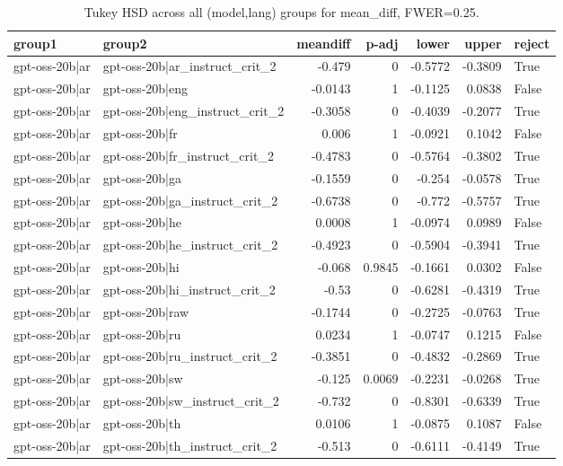 \begin{table}
\caption{Tukey HSD across all (model,lang) groups for mean_diff, FWER=0.25.}
\label{tab:tukey_all_models_all_langs_mean_diff}
\begin{tabular}{l l r r r r l}
\toprule
group1 & group2 & meandiff & p-adj & lower & upper & reject \\
\midrule
gpt-oss-20b|ar & gpt-oss-20b|ar_instruct_crit_2 & -0.479 & 0 & -0.5772 & -0.3809 & True \\
gpt-oss-20b|ar & gpt-oss-20b|eng & -0.0143 & 1 & -0.1125 & 0.0838 & False \\
gpt-oss-20b|ar & gpt-oss-20b|eng_instruct_crit_2 & -0.3058 & 0 & -0.4039 & -0.2077 & True \\
gpt-oss-20b|ar & gpt-oss-20b|fr & 0.006 & 1 & -0.0921 & 0.1042 & False \\
gpt-oss-20b|ar & gpt-oss-20b|fr_instruct_crit_2 & -0.4783 & 0 & -0.5764 & -0.3802 & True \\
gpt-oss-20b|ar & gpt-oss-20b|ga & -0.1559 & 0 & -0.254 & -0.0578 & True \\
gpt-oss-20b|ar & gpt-oss-20b|ga_instruct_crit_2 & -0.6738 & 0 & -0.772 & -0.5757 & True \\
gpt-oss-20b|ar & gpt-oss-20b|he & 0.0008 & 1 & -0.0974 & 0.0989 & False \\
gpt-oss-20b|ar & gpt-oss-20b|he_instruct_crit_2 & -0.4923 & 0 & -0.5904 & -0.3941 & True \\
gpt-oss-20b|ar & gpt-oss-20b|hi & -0.068 & 0.9845 & -0.1661 & 0.0302 & False \\
gpt-oss-20b|ar & gpt-oss-20b|hi_instruct_crit_2 & -0.53 & 0 & -0.6281 & -0.4319 & True \\
gpt-oss-20b|ar & gpt-oss-20b|raw & -0.1744 & 0 & -0.2725 & -0.0763 & True \\
gpt-oss-20b|ar & gpt-oss-20b|ru & 0.0234 & 1 & -0.0747 & 0.1215 & False \\
gpt-oss-20b|ar & gpt-oss-20b|ru_instruct_crit_2 & -0.3851 & 0 & -0.4832 & -0.2869 & True \\
gpt-oss-20b|ar & gpt-oss-20b|sw & -0.125 & 0.0069 & -0.2231 & -0.0268 & True \\
gpt-oss-20b|ar & gpt-oss-20b|sw_instruct_crit_2 & -0.732 & 0 & -0.8301 & -0.6339 & True \\
gpt-oss-20b|ar & gpt-oss-20b|th & 0.0106 & 1 & -0.0875 & 0.1087 & False \\
gpt-oss-20b|ar & gpt-oss-20b|th_instruct_crit_2 & -0.513 & 0 & -0.6111 & -0.4149 & True \\

\end{tabular}
\end{table}
